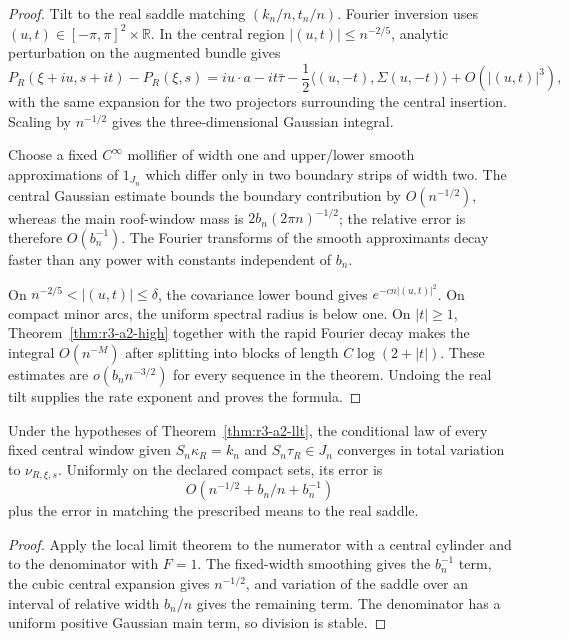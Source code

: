 \begin{proof}
Tilt to the real saddle matching \((k_n/n,t_n/n)\).  Fourier inversion uses
\((u,t)\in[-\pi,\pi]^2\times\mathbb R\).  In the central region
\(|(u,t)|\le n^{-2/5}\), analytic perturbation on the augmented bundle gives
\[
 P_R(\xi+iu,s+it)-P_R(\xi,s)
 =iu\cdot a-it\bar\tau
 -\frac12\langle(u,-t),\Sigma(u,-t)\rangle
 +O(|(u,t)|^3),
\]
with the same expansion for the two projectors surrounding the central
insertion.  Scaling by \(n^{-1/2}\) gives the three-dimensional Gaussian
integral.

Choose a fixed \(C^\infty\) mollifier of width one and upper/lower smooth
approximations of \(1_{J_n}\) which differ only in two boundary strips of
width two.  The central Gaussian estimate bounds the boundary contribution by
\(O(n^{-1/2})\), whereas the main roof-window mass is
\(2b_n(2\pi n)^{-1/2}\); the relative error is therefore \(O(b_n^{-1})\).
The Fourier transforms of the smooth approximants decay faster than any
power with constants independent of \(b_n\).

On
\(n^{-2/5}<|(u,t)|\le\delta\), the covariance lower bound gives
\(e^{-cn|(u,t)|^2}\).  On compact minor arcs, the uniform spectral radius is
below one.  On \(|t|\ge1\), Theorem~\ref{thm:r3-a2-high} together with the
rapid Fourier decay makes the integral
\(O(n^{-M})\) after splitting into blocks of length \(C\log(2+|t|)\).
These estimates are \(o(b_nn^{-3/2})\) for every sequence in the theorem.
Undoing the real tilt supplies the rate exponent and proves the formula.
\end{proof}

\begin{corollary}
\label{cor:r3-a2-conditioning}
Under the hypotheses of Theorem~\ref{thm:r3-a2-llt}, the conditional law of
every fixed central window given
\(S_n\kappa_R=k_n\) and \(S_n\tau_R\in J_n\) converges in total variation to
\(\nu_{R,\xi,s}\).  Uniformly on the declared compact sets, its error is
\[
 O\left(n^{-1/2}+b_n/n+b_n^{-1}\right)
\]
plus the error in matching the prescribed means to the real saddle.
\end{corollary}

\begin{proof}
Apply the local limit theorem to the numerator with a central cylinder and to
the denominator with \(F=1\).  The fixed-width smoothing gives the
\(b_n^{-1}\) term, the cubic central expansion gives \(n^{-1/2}\), and
variation of the saddle over an interval of relative width \(b_n/n\) gives
the remaining term.  The denominator has a uniform positive Gaussian main
term, so division is stable.
\end{proof}

